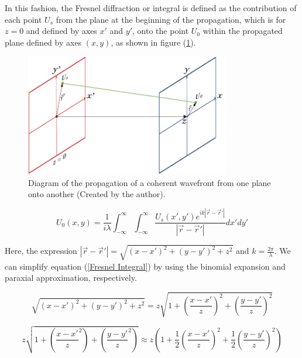 In this fashion, the Fresnel diffraction or integral is defined as the contribution of each point $U_s$ from the plane at the beginning of the propagation, which is for $z = 0$ and defined by axes $x'$ and $y'$, onto the point $U_0$ within the propagated plane defined by axes $(x,y)$, as shown in figure (\ref{fig:Propagation_Diagram}).

\begin{figure}[htbp]
    \centering
    \includegraphics[width=9cm]{images/c02/Propagation/Propagation.png}
    \caption{Diagram of the propagation of a coherent wavefront from one plane onto another (Created by the author).}
    \label{fig:Propagation_Diagram}
\end{figure}

\begin{equation}
    U_0(x,y) = \frac{1}{i\lambda}\int_{-\infty}^{\infty}\int_{-\infty}^{\infty}\frac{U_s(x',y')e^{ik|\overrightarrow{r}-\overrightarrow{r}'|}}{|\overrightarrow{r}-\overrightarrow{r}'|}dx'dy'
    \label{Fresnel Integral}
\end{equation}

Here, the expression $|\overrightarrow{r}-\overrightarrow{r}'| = \sqrt{(x-x')^2+(y-y')^2+z^2}$ and $k = \frac{2\pi}{\lambda}$. We can simplify equation (\ref{Fresnel Integral}) by using the binomial expansion and paraxial approximation, respectively.

\begin{equation}
    \sqrt{(x-x')^2+(y-y')^2+z^2} = z\sqrt{1 + \left( \frac{x - x'}{z} \right)^2 + \left( \frac{y - y'}{z} \right)^2}
    \label{Binomial Expansion}
\end{equation}

\begin{equation}
    z\sqrt{1 + \left( \frac{x - x'}{z}^2 \right) + \left( \frac{y - y'}{z}^2 \right)} \approx z \left( 1 + \frac{1}{2} \left( \frac{x - x'}{z} \right)^2 + \frac{1}{2} \left( \frac{y - y'}{z} \right)^2 \right)
    \label{Paraxial Approximation}
\end{equation}

